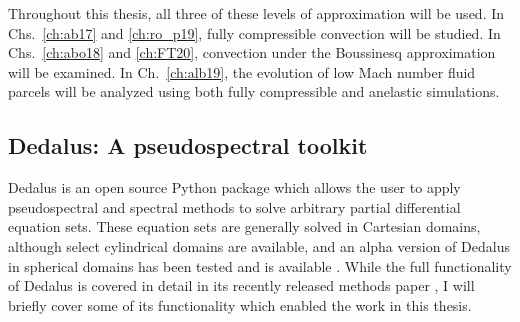 Throughout this thesis, all three of these levels of approximation will be used.
In Chs.~\ref{ch:ab17} and \ref{ch:ro_p19}, fully compressible convection will be studied.
In Chs.~\ref{ch:abo18} and \ref{ch:FT20}, convection under the Boussinesq approximation will be examined.
In Ch.~\ref{ch:alb19}, the evolution of low Mach number fluid parcels will be analyzed using both fully compressible and anelastic simulations.

\subsection{Dedalus: A pseudospectral toolkit}
\label{sct:dedalus}
Dedalus is an open source Python package which allows the user to apply pseudospectral and spectral methods to solve arbitrary partial differential equation sets.
These equation sets are generally solved in Cartesian domains, although select cylindrical domains are available, and an alpha version of Dedalus in spherical domains has been tested and is available \citep{vasil&all2019, lecoanet&all2019}.
While the full functionality of Dedalus is covered in detail in its recently released methods paper \citep{burns&all2019}, I will briefly cover some of its functionality which enabled the work in this thesis.

